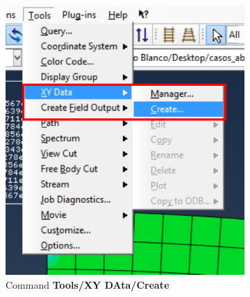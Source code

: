 \begin{enumerate}
\begin{figure}[H]
  \centering
  \begin{subfigure}{0.30\textwidth}
    \includegraphics[width=\textwidth]{./body/images/imagen104.pdf}
    \caption{Command \textbf{Tools/XY DAta/Create} }
    \label{figu104}
  \end{subfigure}%
  ~ %
  \begin{subfigure}{0.30\textwidth}

\end{subfigure}
\end{figure}
\end{enumerate}
